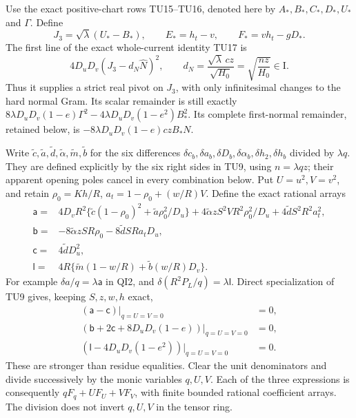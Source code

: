 Use the exact positive-chart rows TU15--TU16, denoted here by
$A_*,B_*,C_*,D_*,U_*$ and $\Gamma$. Define
\[
 J_3=\sqrt\lambda(U_*-B_*),\qquad
 E_*=h_t-v,\qquad F_*=vh_t-gD_*.
                                                               \tag{UL4}
\]
The first line of the exact whole-current identity TU17 is
\[
 4D_uD_v\left(J_3-d_N\widehat N\right)^2,\qquad
 d_N=\frac{\sqrt\lambda\,cz}{\sqrt{H_0}}
       =\sqrt{\frac{nz}{H_0}}\in\mathrm I.                       \tag{UL5}
\]
Thus it supplies a strict real pivot on $J_3$, with only
infinitesimal changes to the hard normal Gram. Its scalar
remainder is still exactly
$8\lambda D_uD_v(1-e)\Gamma^2
-4\lambda D_uD_v(1-e^2)B_*^2$.
Its complete first-normal remainder, retained below, is
$-8\lambda D_uD_v(1-e)czB_*N$.

Write $\widetilde c,\widetilde a,\widetilde d,\widetilde\alpha,
\widetilde m,\widetilde b$ for the six differences
$\delta c_b,\delta a_b,\delta D_b,\delta\alpha_b,
\delta h_2,\delta h_b$ divided by $\lambda q$.
They are defined explicitly by the six right sides in TU9, using
$n=\lambda qz$; their apparent opening poles cancel in every
combination below. Put $U=u^2,V=v^2$, and retain
$\rho_0=Kh/R$, $a_t=1-\rho_0+(w/R)V$.
Define the exact rational arrays
\[
\begin{split}
\mathsf a={}&4D_vR^2\{\widetilde c(1-\rho_0)^2
                      +\widetilde a\rho_0^2/D_u\}
 +4\widetilde\alpha zS^2VR^2\rho_0^2/D_u
 +4\widetilde d S^2R^2a_t^2,\\
\mathsf b={}&-8\widetilde\alpha zSR\rho_0
                         -8\widetilde d SRa_tD_u,\\
\mathsf c={}&4\widetilde dD_u^2,\\
\mathsf l={}&4R\{\widetilde m(1-w/R)
                              +\widetilde b(w/R)D_v\}.
\end{split}                                                     \tag{UL6}
\]
For example $\delta a/q=\lambda\mathsf a$ in QI2,
and $\delta(R^2P_L/q)=\lambda\mathsf l$.
Direct specialization of TU9 gives, keeping $S,z,w,h$ exact,
\[
\begin{split}
 (\mathsf a-\mathsf c)|_{q=U=V=0}&=0,\\
 (\mathsf b+2\mathsf c+8D_uD_v(1-e))|_{q=U=V=0}&=0,\\
 (\mathsf l-4D_uD_v(1-e^2))|_{q=U=V=0}&=0.
\end{split}                                                     \tag{UL7}
\]
These are stronger than residue equalities. Clear the unit
denominators and divide successively by the monic variables
$q,U,V$. Each of the three expressions is consequently
$qF_q+UF_U+VF_V$, with finite bounded rational coefficient arrays.
The division does not invert $q,U,V$ in the tensor ring.

